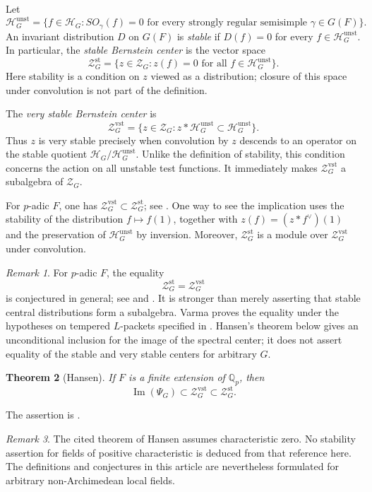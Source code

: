 \documentclass[11pt,a4paper]{amsart}
\newcommand{\mcH}{\mathcal H}
\newcommand{\mcZ}{\mathcal Z}
\newtheorem{theorem}{Theorem}[section]
\theoremstyle{definition}
\theoremstyle{remark}
\newtheorem{remark}[theorem]{Remark}
\begin{document}
Let
$$
 \mcH_G^{\mathrm{unst}}
  =\{f\in\mcH_G:SO_\gamma(f)=0
       \text{ for every strongly regular semisimple }\gamma\in G(F)\}.
$$
An invariant distribution $D$ on $G(F)$ is \emph{stable} if
$D(f)=0$ for every $f\in\mcH_G^{\mathrm{unst}}$.
In particular, the \emph{stable Bernstein center} is the vector space
$$
 \mcZ_G^{\mathrm{st}}
   =\{z\in\mcZ_G:z(f)=0\text{ for all }f\in\mcH_G^{\mathrm{unst}}\}.
$$
Here stability is a condition on $z$ viewed as a distribution;
closure of this space under convolution is not part of the definition.

The \emph{very stable Bernstein center} is
$$
 \mcZ_G^{\mathrm{vst}}
   =\{z\in\mcZ_G:z*\mcH_G^{\mathrm{unst}}
                              \subset\mcH_G^{\mathrm{unst}}\}.
$$
Thus $z$ is very stable precisely when convolution by $z$ descends
to an operator on the stable quotient
$\mcH_G/\mcH_G^{\mathrm{unst}}$. Unlike the definition of stability,
this condition concerns the action on all unstable test functions.
It immediately makes $\mcZ_G^{\mathrm{vst}}$ a subalgebra of
$\mcZ_G$.

For $p$-adic $F$, one has
$\mcZ_G^{\mathrm{vst}}\subset\mcZ_G^{\mathrm{st}}$;
see \cite[Remark 1.1.2]{Varma}. One way to see the implication uses
the stability of the distribution $f\mapsto f(1)$, together with
$z(f)=(z*f^\vee)(1)$ and the preservation of
$\mcH_G^{\mathrm{unst}}$ by inversion. Moreover,
$\mcZ_G^{\mathrm{st}}$ is a module over
$\mcZ_G^{\mathrm{vst}}$ under convolution.

\begin{remark}
For $p$-adic $F$, the equality
$$
 \mcZ_G^{\mathrm{st}}=\mcZ_G^{\mathrm{vst}}
$$
is conjectured in general; see \cite[Conjecture 1.1.4]{Varma}
and \cite[Section 1.1]{H}. It is stronger than merely asserting
that stable central distributions form a subalgebra. Varma proves
the equality under the hypotheses on tempered $L$-packets specified
in \cite[Hypothesis 2.5.1 and Theorem 4.4.2]{Varma}.
Hansen's theorem below gives an unconditional inclusion for the
image of the spectral center; it does not assert equality of the
stable and very stable centers for arbitrary $G$.
\end{remark}

\begin{theorem}[Hansen]
If $F$ is a finite extension of $\mathbb Q_p$, then
$$
\operatorname{Im}(\Psi_G)\subset\mcZ_G^{\mathrm{vst}}\subset\mcZ_G^{\mathrm{st}}.
$$
\end{theorem}
The assertion is \cite[Theorem 1.1]{H}.
\begin{remark}
The cited theorem of Hansen assumes characteristic zero. No stability assertion for fields of positive characteristic is deduced from that reference here. The definitions and conjectures in this article are nevertheless formulated for arbitrary non-Archimedean local fields.
\end{remark}
\end{document}
